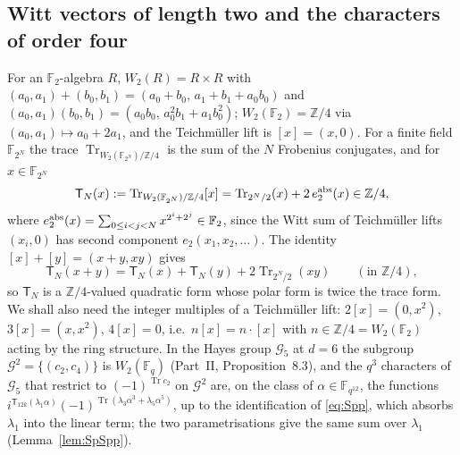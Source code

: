 \documentclass[12pt,a4paper]{amsart}
\theoremstyle{definition}
\newcommand{\F}{\mathbb{F}}
\newcommand{\Z}{\mathbb{Z}}
\newcommand{\G}{\mathcal{G}}
\newcommand{\Tr}{\operatorname{Tr}}
\begin{document}
\subsection{Witt vectors of length two and the characters of order four}\label{subsec:witt}
For an $\F_2$-algebra $R$, $W_2(R)=R\times R$ with $(a_0,a_1)+(b_0,b_1)=(a_0+b_0,\,a_1+b_1+a_0b_0)$ and $(a_0,a_1)(b_0,b_1)=(a_0b_0,\,a_0^2b_1+a_1b_0^2)$; $W_2(\F_2)=\Z/4$ via $(a_0,a_1)\mapsto a_0+2a_1$, and the Teichm\"uller lift is $[x]=(x,0)$. For a finite field $\F_{2^N}$ the trace $\Tr_{W_2(\F_{2^N})/\Z/4}$ is the sum of the $N$ Frobenius conjugates, and for $x\in\F_{2^N}$
\begin{equation}\label{eq:T}
\mathsf T_N(x):=\Tr_{W_2(\F_{2^N})/\Z/4}[x]=\Tr_{2^N/2}(x)+2\,e_2^{\rm abs}(x)\in\Z/4,
\end{equation}
where $e_2^{\rm abs}(x)=\sum_{0\le i<j<N}x^{2^i+2^j}\in\F_2$, since the Witt sum of Teichm\"uller lifts $(x_i,0)$ has second component $e_2(x_1,x_2,\dots)$. The identity $[x]+[y]=(x+y,xy)$ gives
\begin{equation}\label{eq:Tpolar}
\mathsf T_N(x+y)=\mathsf T_N(x)+\mathsf T_N(y)+2\Tr_{2^N/2}(xy)\qquad(\text{in }\Z/4),
\end{equation}
so $\mathsf T_N$ is a $\Z/4$-valued quadratic form whose polar form is twice the trace form. We shall also need the integer multiples of a Teichm\"uller lift: $2[x]=(0,x^2)$, $3[x]=(x,x^2)$, $4[x]=0$, i.e.\ $n[x]=n\cdot[x]$ with $n\in\Z/4=W_2(\F_2)$ acting by the ring structure. In the Hayes group $\G_5$ at $d=6$ the subgroup $\G^2=\{(c_2,c_4)\}$ is $W_2(\F_q)$ (Part~II, Proposition~8.3), and the $q^3$ characters of $\G_5$ that restrict to $(-1)^{\Tr c_2}$ on $\G^2$ are, on the class of $\alpha\in\F_{q^{12}}$, the functions $i^{\mathsf T_{12k}(\lambda_1\alpha)}(-1)^{\Tr(\lambda_3\alpha^3+\lambda_5\alpha^5)}$, up to the identification of \eqref{eq:Spp}, which absorbs $\lambda_1$ into the linear term; the two parametrisations give the same sum over $\lambda_1$ (Lemma~\ref{lem:SpSpp}).
\end{document}
